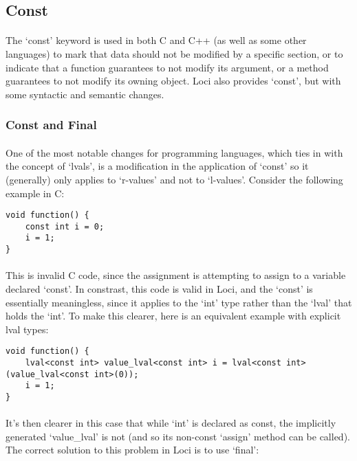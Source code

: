 \documentclass[12pt,twoside,notitlepage]{report}
\begin{document}
\clearpage

\subsection{Const}

\paragraph{}
The `const' keyword is used in both C and C++ (as well as some other languages) to mark that data should not be modified by a specific section, or to indicate that a function guarantees to not modify its argument, or a method guarantees to not modify its owning object. Loci also provides `const', but with some syntactic and semantic changes.

\subsubsection{Const and Final}

\paragraph{}
One of the most notable changes for programming languages, which ties in with the concept of `lvals', is a modification in the application of `const' so it (generally) only applies to `r-values' and not to `l-values'. Consider the following example in C:

\begin{lstlisting}
void function() {
	const int i = 0;
	i = 1;
}
\end{lstlisting}

\paragraph{}
This is invalid C code, since the assignment is attempting to assign to a variable declared `const'. In constrast, this code is valid in Loci, and the `const' is essentially meaningless, since it applies to the `int' type rather than the `lval' that holds the `int'. To make this clearer, here is an equivalent example with explicit lval types:

\begin{lstlisting}
void function() {
	lval<const int> value_lval<const int> i = lval<const int>(value_lval<const int>(0));
	i = 1;
}
\end{lstlisting}

\paragraph{}
It's then clearer in this case that while `int' is declared as const, the implicitly generated `value\_lval' is not (and so its non-const `assign' method can be called). The correct solution to this problem in Loci is to use `final':
\end{document}
